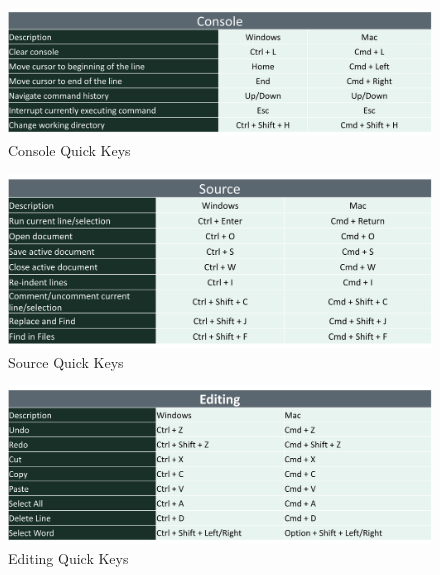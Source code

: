 \documentclass[
  letterpaper,
  DIV=11,
  numbers=noendperiod]{scrreprt}
\begin{document}
\begin{figure}[H]

{\centering \includegraphics{Pictures/Ch0/QuickKeys1.png}

}

\caption{Console Quick Keys}

\end{figure}%
\begin{figure}[H]

{\centering \includegraphics{Pictures/Ch0/QuickKeys2.png}

}

\caption{Source Quick Keys}

\end{figure}%
\begin{figure}[H]

{\centering \includegraphics{Pictures/Ch0/QuickKeys3.png}

}

\caption{Editing Quick Keys}

\end{figure}%
\end{document}

